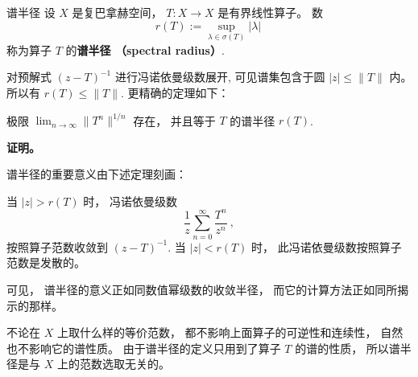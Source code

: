 
\begin{definition}{谱半径}
设 $X$ 是复巴拿赫空间， $T:X\to X$ 是有界线性算子。 数
$$
r(T):=\sup_{\lambda\in\sigma(T)}|\lambda|~
$$
称为算子 $T$ 的\textbf{谱半径 （spectral radius）}.
\end{definition}

对预解式 $(z-T)^{-1}$ 进行冯诺依曼级数展开, 可见谱集包含于圆 $|z|\leq\|T\|$ 内。 所以有 $r(T)\leq\|T\|$. 更精确的定理如下：
\begin{theorem}{}
极限 $\lim_{n\to\infty}\|T^n\|^{1/n}$ 存在， 并且等于 $T$ 的谱半径 $r(T)$. 
\end{theorem}
\textbf{证明。} 

谱半径的重要意义由下述定理刻画：
\begin{theorem}{}
当 $|z|>r(T)$ 时， 冯诺依曼级数
$$
\frac{1}{z}\sum_{n=0}^\infty\frac{T^n}{z^n}~,
$$ 
按照算子范数收敛到 $(z-T)^{-1}$. 当 $|z|<r(T)$ 时， 此冯诺依曼级数按照算子范数是发散的。
\end{theorem}

可见， 谱半径的意义正如同数值幂级数的收敛半径， 而它的计算方法正如同所揭示的那样。

不论在 $X$ 上取什么样的等价范数， 都不影响上面算子的可逆性和连续性， 自然也不影响它的谱性质。 由于谱半径的定义只用到了算子 $T$ 的谱的性质， 所以谱半径是与 $X$ 上的范数选取无关的。 
